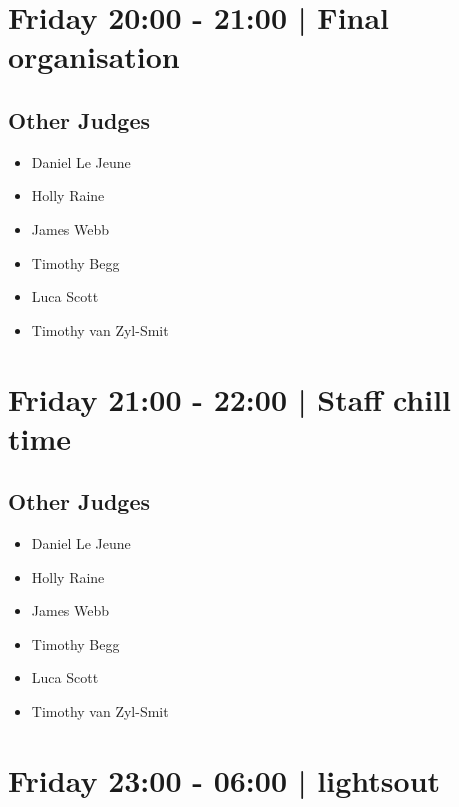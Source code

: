 \documentclass[10pt]{article}
\begin{document}
            \section*{Friday 20:00
        -
        21:00
        |
         Final organisation}
        
                
        \subsection*{Other Judges}
        
            \begin{itemize}
                            \item Daniel Le Jeune
                            \item Holly Raine
                            \item James Webb
                            \item Timothy Begg
                            \item Luca Scott
                            \item Timothy van Zyl-Smit
                        \end{itemize}
        

            \section*{Friday 21:00
        -
        22:00
        |
         Staff chill time}
        
                
        \subsection*{Other Judges}
        
            \begin{itemize}
                            \item Daniel Le Jeune
                            \item Holly Raine
                            \item James Webb
                            \item Timothy Begg
                            \item Luca Scott
                            \item Timothy van Zyl-Smit
                        \end{itemize}
        

            \section*{Friday 23:00
        -
        06:00
        |
         lightsout}
        
\end{document}
